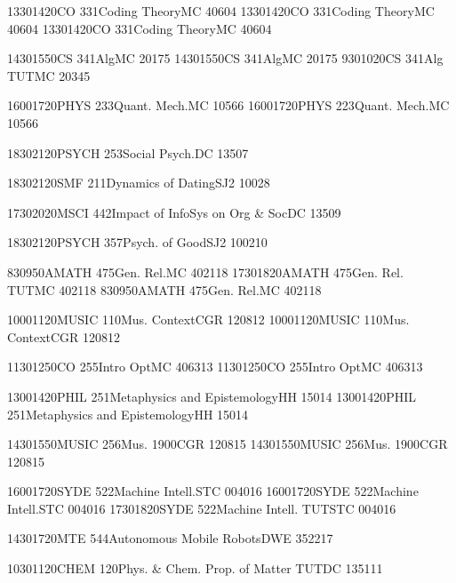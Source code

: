 \documentclass[preview]{standalone}
\begin{document}
\begin{center}
\begin{landscape}
\begin{timetable}
 {1330}{1420}{CO 331}{\tiny Coding Theory}{MC 4060}{4}
 {1330}{1420}{CO 331}{\tiny Coding Theory}{MC 4060}{4}
 {1330}{1420}{CO 331}{\tiny Coding Theory}{MC 4060}{4}

 {1430}{1550}{CS 341}{Alg}{MC 2017}{5}
 {1430}{1550}{CS 341}{Alg}{MC 2017}{5}
 {930}{1020}{CS 341}{Alg TUT}{MC 2034}{5}

 {1600}{1720}{PHYS 233}{\tiny Quant. Mech.}{MC 1056}{6}
 {1600}{1720}{PHYS 223}{\tiny Quant. Mech.}{MC 1056}{6}

 {1830}{2120}{PSYCH 253}{\tiny Social Psych.}{DC 1350}{7}

 {1830}{2120}{SMF 211}{\tiny Dynamics of Dating}{SJ2 1002}{8}

 {1730}{2020}{MSCI 442}{\tiny Impact of InfoSys on Org \& Soc}{DC 1350}{9}

 {1830}{2120}{PSYCH 357}{\tiny Psych. of Good}{SJ2 1002}{10}


 {830}{950}{AMATH 475}{\tiny Gen. Rel.}{MC 4021}{18}
 {1730}{1820}{AMATH 475}{\tiny Gen. Rel. TUT}{MC 4021}{18}
 {830}{950}{AMATH 475}{\tiny Gen. Rel.}{MC 4021}{18}

 {1000}{1120}{MUSIC 110}{\tiny Mus. Context}{CGR 1208}{12}
 {1000}{1120}{MUSIC 110}{\tiny Mus. Context}{CGR 1208}{12}

 {1130}{1250}{CO 255}{\tiny Intro Opt}{MC 4063}{13}
 {1130}{1250}{CO 255}{\tiny Intro Opt}{MC 4063}{13}

 {1300}{1420}{PHIL 251}{\tiny Metaphysics and Epistemology}{HH 150}{14}
 {1300}{1420}{PHIL 251}{\tiny Metaphysics and Epistemology}{HH 150}{14}

 {1430}{1550}{MUSIC 256}{\tiny Mus. 1900}{CGR 1208}{15}
 {1430}{1550}{MUSIC 256}{\tiny Mus. 1900}{CGR 1208}{15}

 {1600}{1720}{SYDE 522}{\tiny Machine Intell.}{STC 0040}{16}
 {1600}{1720}{SYDE 522}{\tiny Machine Intell.}{STC 0040}{16}
 {1730}{1820}{SYDE 522}{\tiny Machine Intell. TUT}{STC 0040}{16}

 {1430}{1720}{MTE 544}{\tiny Autonomous Mobile Robots}{DWE 3522}{17}

 {1030}{1120}{CHEM 120}{\tiny Phys. \& Chem. Prop. of Matter TUT}{DC 1351}{11}
		\end{timetable}	
	\end{landscape}
\end{center}
\end{document}

